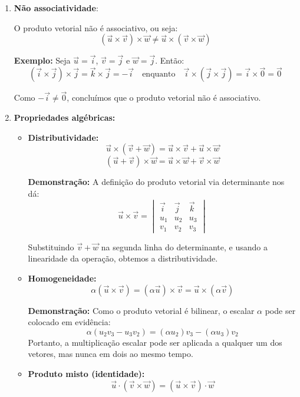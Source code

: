 \begin{enumerate}
  \item \textbf{Não associatividade}:
  
  O produto vetorial não é associativo, ou seja:
  \[
    (\vec{u} \times \vec{v}) \times \vec{w} \neq \vec{u} \times (\vec{v} \times \vec{w})
  \]

  \textbf{Exemplo:} Seja $\vec{u} = \vec{i}$, $\vec{v} = \vec{j}$ e $\vec{w} = \vec{j}$. Então:
  \[
    (\vec{i} \times \vec{j}) \times \vec{j} = \vec{k} \times \vec{j} = -\vec{i}
  \quad \text{enquanto} \quad
    \vec{i} \times (\vec{j} \times \vec{j}) = \vec{i} \times \vec{0} = \vec{0}
  \]

  Como $-\vec{i} \neq \vec{0}$, concluímos que o produto vetorial não é
    associativo.

  \item \textbf{Propriedades algébricas:}
  
  \begin{itemize}
    \item \textbf{Distributividade:}
    \[
      \vec{u} \times (\vec{v} + \vec{w}) = \vec{u} \times \vec{v} + \vec{u} \times \vec{w}
    \]
    \[
      (\vec{u} + \vec{v}) \times \vec{w} = \vec{u} \times \vec{w} + \vec{v} \times \vec{w}
    \]
    
    \textbf{Demonstração:} A definição do produto vetorial via determinante nos dá:
    \[
    \vec{u} \times \vec{v} =
    \begin{vmatrix}
    \vec{i} & \vec{j} & \vec{k} \\
    u_1 & u_2 & u_3 \\
    v_1 & v_2 & v_3
    \end{vmatrix}
    \]
    
    Substituindo $\vec{v} + \vec{w}$ na segunda linha do determinante, e usando
      a linearidade da operação, obtemos a distributividade.

    \item \textbf{Homogeneidade:}
    \[
      \alpha(\vec{u} \times \vec{v}) = (\alpha \vec{u}) \times \vec{v} = \vec{u} \times (\alpha \vec{v})
    \]

    \textbf{Demonstração:} Como o produto vetorial é bilinear, o escalar
      $\alpha$ pode ser colocado em evidência:
    \[
    \alpha(u_2v_3 - u_3v_2) = (\alpha u_2)v_3 - (\alpha u_3)v_2
    \]
    Portanto, a multiplicação escalar pode ser aplicada a qualquer um dos
    vetores, mas nunca em dois ao mesmo tempo.

    \item \textbf{Produto misto (identidade):}
    \[
      \vec{u} \cdot (\vec{v} \times \vec{w}) = (\vec{u} \times \vec{v}) \cdot \vec{w}
    \]


\end{itemize}
\end{enumerate}
